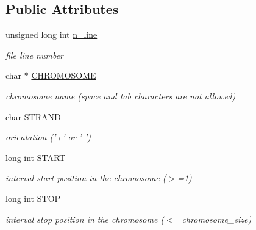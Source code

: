 \subsection*{Public Attributes}
\begin{CompactItemize}
\item 
\hypertarget{classGenomicInterval_0dbe6195570468c386eea923e30c762c}{
unsigned long int \hyperlink{classGenomicInterval_0dbe6195570468c386eea923e30c762c}{n\_\-line}}
\label{classGenomicInterval_0dbe6195570468c386eea923e30c762c}

\begin{CompactList}\small\item\em file line number \item\end{CompactList}\item 
\hypertarget{classGenomicInterval_c489a1195c43cc93d0e192dc91d5a192}{
char $\ast$ \hyperlink{classGenomicInterval_c489a1195c43cc93d0e192dc91d5a192}{CHROMOSOME}}
\label{classGenomicInterval_c489a1195c43cc93d0e192dc91d5a192}

\begin{CompactList}\small\item\em chromosome name (space and tab characters are not allowed) \item\end{CompactList}\item 
\hypertarget{classGenomicInterval_25f6603b48fcc57f97c89fa768b658f9}{
char \hyperlink{classGenomicInterval_25f6603b48fcc57f97c89fa768b658f9}{STRAND}}
\label{classGenomicInterval_25f6603b48fcc57f97c89fa768b658f9}

\begin{CompactList}\small\item\em orientation ('+' or '-') \item\end{CompactList}\item 
\hypertarget{classGenomicInterval_c0abba93599f5cdf4b5a4e7ec5909bbd}{
long int \hyperlink{classGenomicInterval_c0abba93599f5cdf4b5a4e7ec5909bbd}{START}}
\label{classGenomicInterval_c0abba93599f5cdf4b5a4e7ec5909bbd}

\begin{CompactList}\small\item\em interval start position in the chromosome ($>$=1) \item\end{CompactList}\item 
\hypertarget{classGenomicInterval_c5fac21da3939b7976859a54800b93f0}{
long int \hyperlink{classGenomicInterval_c5fac21da3939b7976859a54800b93f0}{STOP}}
\label{classGenomicInterval_c5fac21da3939b7976859a54800b93f0}

\begin{CompactList}\small\item\em interval stop position in the chromosome ($<$=chromosome\_\-size) \item\end{CompactList}\end{CompactItemize}


